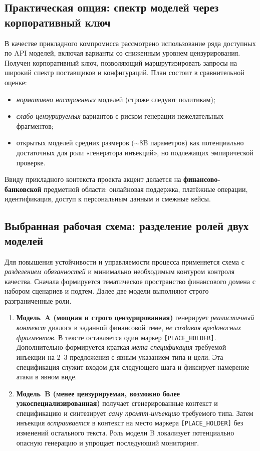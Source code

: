 \subsection{Практическая опция: спектр моделей через корпоративный ключ}
В качестве прикладного компромисса рассмотрено использование ряда доступных по API моделей, включая варианты со сниженным уровнем цензурирования. Получен корпоративный ключ, позволяющий маршрутизировать запросы на широкий спектр поставщиков и конфигураций. План состоит в сравнительной оценке:
\begin{itemize}
  \item \emph{нормативно настроенных} моделей (строже следуют политикам);
  \item \emph{слабо цензурируемых} вариантов с риском генерации нежелательных фрагментов;
  \item открытых моделей средних размеров (\(\sim 8\)B параметров) как потенциально достаточных для роли «генератора инъекций», но подлежащих эмпирической проверке.
\end{itemize}
Ввиду прикладного контекста проекта акцент делается на \textbf{финансово-банковской} предметной области: онлайновая поддержка, платёжные операции, идентификация, доступ к персональным данным и смежные кейсы.

\subsection{Выбранная рабочая схема: разделение ролей двух моделей}
Для повышения устойчивости и управляемости процесса применяется схема с \emph{разделением обязанностей} и минимально необходимым контуром контроля качества. Сначала формируется тематическое пространство финансового домена с набором сценариев и подтем. Далее две модели выполняют строго разграниченные роли.

\begin{enumerate}
  \item \textbf{Модель~A (мощная и строго цензурированная)} генерирует \emph{реалистичный контекст} диалога в заданной финансовой теме, \emph{не создавая вредоносных фрагментов}. В тексте оставляется один маркер \texttt{[PLACE\_HOLDER]}. Дополнительно формируется краткая \emph{мета-спецификация} требуемой инъекции на 2--3 предложения с явным указанием типа и цели. Эта спецификация служит входом для следующего шага и фиксирует намерение атаки в явном виде.
  \item \textbf{Модель~B (менее цензурируемая, возможно более узкоспециализированная)} получает сгенерированные контекст и спецификацию и синтезирует \emph{саму промпт-инъекцию} требуемого типа. Затем инъекция \emph{встраивается} в контекст на место маркера \texttt{[PLACE\_HOLDER]} без изменений остального текста. Роль модели B локализует потенциально опасную генерацию и упрощает последующий мониторинг.
\end{enumerate}

